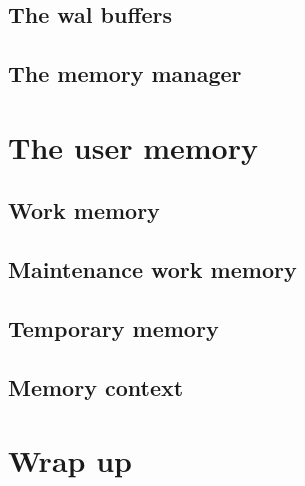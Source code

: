 \subsection{The wal buffers}

\subsection{The memory manager}
\section{The user memory}
\subsection{Work memory}
\subsection{Maintenance work memory}
\subsection{Temporary memory}


\subsection{Memory context}

\section{Wrap up}